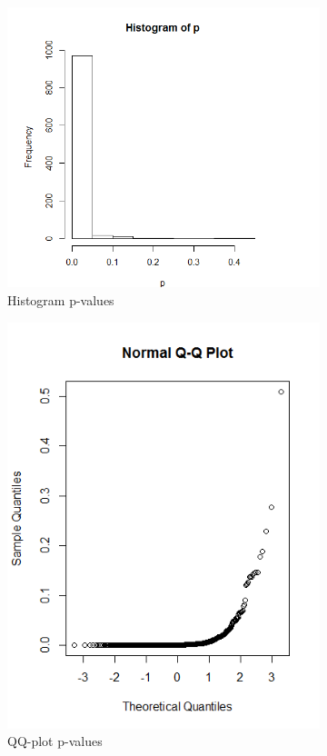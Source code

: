 \documentclass{article}
\begin{document}
      \begin{figure}[!htb]
      \begin{subfigure}{.5\textwidth}
        \centering
        \includegraphics[width=.8\linewidth]{results/2_3}
        \caption{Histogram p-values}
        \end{subfigure}
        \begin{subfigure}{.5\textwidth}
        \centering
        \includegraphics[width=.8\linewidth]{results/2_3_2}
        \caption{QQ-plot p-values}
        \end{subfigure}
        \caption{}
        \label{fig:2_3}
      \end{figure}
      
\end{document}
